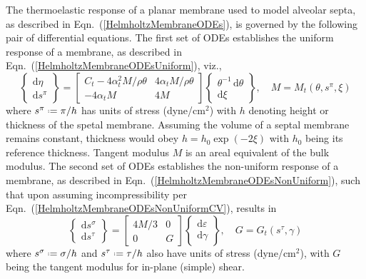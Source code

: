 The thermo\-elastic response of a planar membrane used to model alveolar septa, as described in Eqn.~(\ref{HelmholtzMembraneODEs}), is governed by the following pair of differential equations.  The first set of ODEs establishes the uniform response of a membrane, as described in Eqn.~(\ref{HelmholtzMembraneODEsUniform}), viz.,
\begin{displaymath}
    \left\{ \begin{matrix}
    \mathrm{d} \eta \\ \mathrm{d} s^{\pi}
    \end{matrix} \right\} = \begin{bmatrix}
    C_t - 4 \alpha^2_t M / \rho \theta & 
    4 \alpha_t M / \rho \theta \\
    -4 \alpha_t M & 4 M
    \end{bmatrix} \left\{ \begin{matrix}
    \theta^{-1} \, \mathrm{d} \theta \\ \mathrm{d} \xi
    \end{matrix} \right\} , \quad
    M = M_t ( \theta , s^{\pi} , \xi )
\end{displaymath}
where $s^{\pi} \defeq \pi / h$ has units of stress (dyne/$\text{cm}^2$) with $h$ denoting height or thickness of the spetal membrane.  Assuming the volume of a septal membrane remains constant, thickness would obey $h = h_0 \exp ( -2 \xi )$ with $h_0$ being its reference thickness.  Tangent modulus $M$ is an areal equivalent of the bulk modulus.  The second set of ODEs establishes the non-uniform response of a membrane, as described in Eqn.~(\ref{HelmholtzMembraneODEsNonUniform}), such that upon assuming incompressibility per Eqn.~(\ref{HelmholtzMembraneODEsNonUniformCV}), results in
\begin{displaymath}
    \left\{ \begin{matrix}
    \mathrm{d} s^{\sigma} \\ \mathrm{d} s^{\tau}
    \end{matrix} \right\} = \begin{bmatrix}
    4M/3 & 0 \\
    0 & G
    \end{bmatrix} \left\{ \begin{matrix}
    \mathrm{d} \varepsilon \\ \mathrm{d} \gamma
    \end{matrix} \right\} , \quad
        G = G_t ( s^{\tau} , \gamma )
\end{displaymath}
where $s^{\sigma} \defeq \sigma / h$ and $s^{\tau} \defeq \tau / h$ also have units of stress (dyne/$\text{cm}^2$), with $G$ being the tangent modulus for in-plane (simple) shear. 


